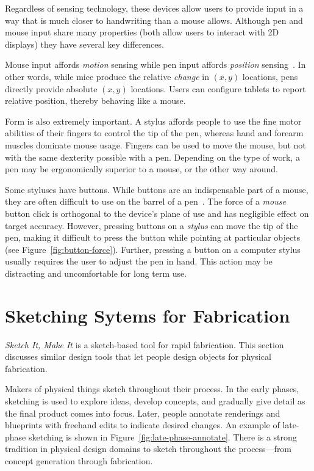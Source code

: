 Regardless of sensing technology, these devices allow users to provide
input in a way that is much closer to handwriting than a mouse
allows. Although pen and mouse input share many properties (both allow
users to interact with 2D displays) they have several key differences.

Mouse input affords \textit{motion} sensing while pen input
affords \textit{position} sensing~\cite{hinckley-input-technology}. In
other words, while mice produce the relative \textit{change} in
$(x,y)$ locations, pens directly provide absolute $(x,y)$ locations.
Users can configure tablets to report relative position, thereby
behaving like a mouse.

Form is also extremely important. A stylus affords people to use the
fine motor abilities of their fingers to control the tip of the pen,
whereas hand and forearm muscles dominate mouse usage. Fingers can be
used to move the mouse, but not with the same dexterity possible with
a pen. Depending on the type of work, a pen may be ergonomically
superior to a mouse, or the other way around.



Some styluses have buttons. While buttons are an indispensable part of
a mouse, they are often difficult to use on the barrel of a
pen~\cite{plimmer-pen-usability}. The force of a \textit{mouse} button
click is orthogonal to the device's plane of use and has negligible
effect on target accuracy. However, pressing buttons on a
\textit{stylus} can move the tip of the pen, making it difficult to
press the button while pointing at particular objects (see
Figure~\ref{fig:button-force}). Further, pressing a button on a
computer stylus usually requires the user to adjust the pen in
hand. This action may be distracting and uncomfortable for long term
use.

\section{Sketching Sytems for Fabrication}

\textit{Sketch It, Make It} is a sketch-based tool for rapid
fabrication. This section discusses similar design tools that let
people design objects for physical fabrication. 

Makers of physical things sketch throughout their process. In the
early phases, sketching is used to explore ideas, develop concepts,
and gradually give detail as the final product comes into
focus. Later, people annotate renderings and blueprints with freehand
edits to indicate desired changes. An example of late-phase sketching
is shown in Figure~\ref{fig:late-phase-annotate}. There is a strong
tradition in physical design domains to sketch throughout the
process---from concept generation through fabrication.

